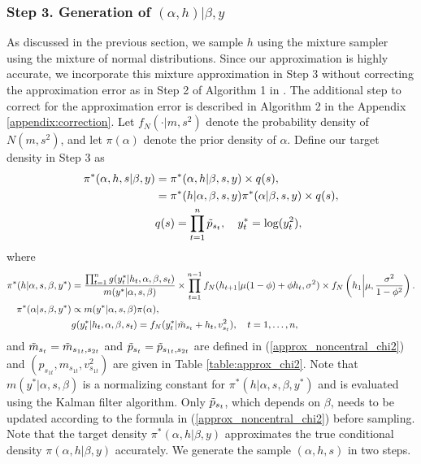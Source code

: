 \subsubsection*{Step 3. Generation of $(\alpha,h)|\beta,y$}
\label{generate h}
As discussed in the previous section, we sample $h$ using the mixture sampler using the mixture of normal distributions. Since our approximation is highly accurate, we incorporate this mixture approximation in Step 3 without correcting the approximation error as in Step 2 of Algorithm 1 in \cite{ChibNardariShephard(02)}. The additional step to correct for the approximation error is described in Algorithm 2 in the Appendix \ref{appendix:correction}.
Let $f_N(\cdot|m, s^2)$ denote the probability density of $N(m, s^2)$, and let $\pi(\alpha)$ denote the prior density of $\alpha$.
Define our target density in Step 3 as 
\begin{align*}
    \pi^*(\alpha,h,s|\beta,y) &= \pi^*(\alpha,h|\beta,s,y) \times q(s),\\
         &= \pi^*(h|\alpha,\beta,s,y)\pi^*(\alpha|\beta,s,y) \times q(s),\\
     & q(s) = \prod_{t=1}^n \Tilde{p}_{s_t}, \quad y_t^* = \log(y_t^2),
\end{align*}
where 
\begin{align*}
    \pi^*(h|\alpha, s, \beta, y^*) &= \frac{\prod_{t=1}^n g(y_t^*| h_t, \alpha,\beta, s_t)}{m(y^*|\alpha,s,\beta)} \times \prod_{t=1}^{n-1}f_N(h_{t+1}|\mu(1-\phi)+\phi h_t,\sigma^2) \times f_N\left( h_1 \bigg| \mu, \frac{\sigma^2}{1-\phi^2} \right).\\
    \pi^*(\alpha|s,\beta,y^*) & \propto  m(y^*|\alpha,s,\beta) \pi(\alpha),\\
    & g(y_t^*| h_t, \alpha, \beta, s_t) = 
    f_N(y_t^*|\Tilde{m}_{s_t} + h_t, v_{s_t}^2), \quad t=1,\ldots,n, 
\end{align*}
and  $\Tilde{m}_{s_t} = \Tilde{m}_{s_{1t}, s_{2t}}$ and $\Tilde{p}_{s_t} = \Tilde{p}_{s_{1t}, s_{2t}}$ are defined in (\ref{approx_noncentral_chi2}) and $(p_{s_{1t}}, m_{s_{1t}}, v_{s_{1t}}^2)$ are given in Table \ref{table:approx_chi2}.
Note that $m(y^*|\alpha,s,\beta)$ is a normalizing constant for $\pi^*(h|\alpha, s, \beta, y^*)$ and is evaluated using the Kalman filter algorithm. Only $\Tilde{p}_{s_t}$, which depends on $\beta$, needs to be updated according to the formula in (\ref{approx_noncentral_chi2}) before sampling.
Note that the target density $\pi^*(\alpha,h|\beta,y)$ approximates the true conditional density $\pi(\alpha,h|\beta,y)$ accurately. We generate the sample $(\alpha, h, s)$ in two steps. 
